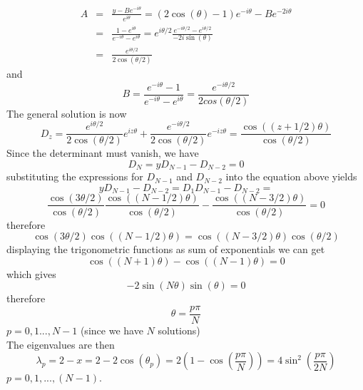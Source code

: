 \documentclass{paper}
\begin{document}
 \begin{eqnarray*}
 A & = & \frac{y-Be^{-i\theta}}{e^{i\theta}} = (2\cos(\theta)-1)e^{-i\theta}-Be^{-2i\theta}\\
   & = & \frac{1-e^{i\theta}}{e^{-i\theta}-e^{i\theta}} = e^{i\theta/2}\frac{e^{-i\theta/2}-e^{i\theta/2}}{-2i\sin(\theta)}\\
   & = & \frac{e^{i\theta/2}}{2\cos(\theta/2)}
 \end{eqnarray*}
 and 
 \begin{equation*}
 B=\frac{e^{-i\theta}-1}{e^{-i\theta}-e^{i\theta}}=\frac{e^{-i\theta/2}}{2cos(\theta/2)}
 \end{equation*}
The general solution is now
\begin{equation}
D_z=\frac{e^{i\theta/2}}{2\cos(\theta/2)}e^{iz\theta}+\frac{e^{-i\theta/2}}{2\cos(\theta/2)}e^{-iz\theta}=\frac{\cos((z+1/2)\theta)}{\cos(\theta/2)}
\end{equation}
Since the determinant must vanish, we have 
\begin{equation*}
D_N = yD_{N-1}-D_{N-2}=0
\end{equation*}
substituting the expressions for $D_{N-1}$ and $D_{N-2}$ into the equation above yields 
\begin{equation*}
yD_{N-1}-D_{N-2} = D_1D_{N-1}-D_{N-2} = 
\end{equation*}
\begin{equation*}
\frac{\cos(3\theta/2)}{\cos(\theta/2)}\frac{\cos((N-1/2)\theta)}{\cos(\theta/2)}-\frac{\cos((N-3/2)\theta)}{\cos(\theta/2)}=0
\end{equation*}
therefore 
\begin{equation*}
\cos(3\theta/2)\cos((N-1/2)\theta)=\cos((N-3/2)\theta)\cos(\theta/2)
\end{equation*}
displaying the trigonometric functions as sum of exponentials we can get
\begin{equation*}
\cos((N+1)\theta)-\cos((N-1)\theta)=0
\end{equation*}
which gives 
\begin{equation*}
-2\sin(N\theta)\sin(\theta)=0
\end{equation*}
therefore 
\begin{equation*}
\theta = \frac{p\pi}{N}
\end{equation*}
$p=0,1...,N-1$ (since we have $N$ solutions)\\

The eigenvalues are then
\begin{equation*}
\lambda_p=2-x = 2-2\cos(\theta_p)=2\left(1-\cos(\frac{p\pi}{N})\right)=4\sin^2(\frac{p\pi}{2N})
\end{equation*}
$p=0,1,...,(N-1)$.
\end{document}
